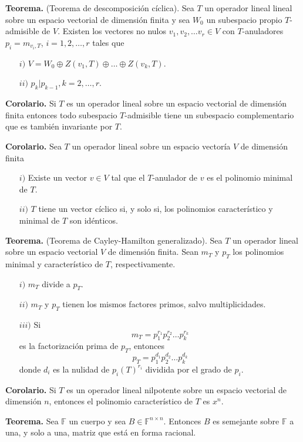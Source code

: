 \newpage

\textbf{Teorema.} (Teorema de descomposición cíclica).
Sea $T$ un operador lineal lineal sobre un espacio vectorial
de dimensión finita y sea $W_0$ un subespacio propio
$T$-admisible de $V$. Existen los vectores no nulos
$v_1, v_2, \dots v_r\in V$ con $T$-anuladores
$p_i=m_{v_i, T}$, $i=1,2,\dots,r$ tales que
\begin{itemize}
    \item[$i)$] $V=W_0\oplus Z(v_1, T)\oplus \dots \oplus Z(v_k, T)$.
    \item[$ii)$] $p_k|p_{k-1}, k=2,\dots,r$.
\end{itemize}

\textbf{Corolario.} Si $T$ es un operador lineal sobre
un espacio vectorial de dimensión finita entonces todo
subespacio $T$-admisible tiene un subespacio complementario
que es también invariante por $T$.

\textbf{Corolario.}
Sea $T$ un operador lineal sobre un espacio vectoría $V$ de dimensión
finita
\begin{itemize}
    \item[$i)$] Existe un vector $v\in V$ tal que el $T$-anulador
    de $v$ es el polinomio minimal de $T$.
    \item[$ii)$] $T$ tiene un vector cíclico si, y solo si, los
    polinomios característico y minimal de $T$ son idénticos.
\end{itemize}

\textbf{Teorema.} (Teorema de Cayley-Hamilton generalizado). Sea $T$
un operador lineal sobre un espacio vectorial $V$ de dimensión finita.
Sean $m_T$ y $p_T$ los polinomios minimal y característico de $T$,
respectivamente.
\begin{itemize}
    \item[$i)$]  $m_T$ divide a $p_T$.
    \item[$ii)$]  $m_T$ y $p_T$ tienen los mismos factores primos,
    salvo multiplicidades.
    \item[$iii)$] Si $$m_T=p_1^{r_1}p_2^{r_2}\dots p_k^{r_k}$$
    es la factorización prima de $p_T$, entonces
    $$p_T=p_1^{d_1}p_2^{d_2}\dots p_k^{d_k}$$
    donde $d_i$ es la nulidad de $p_i(T)^{r_i}$ dividida por el grado de $p_i$.
\end{itemize}

\textbf{Corolario.} Si $T$ es un operador lineal nilpotente
sobre un espacio vectorial de dimensión $n$, entonces el
polinomio característico de $T$ es $x^{n}$.

\textbf{Teorema.} Sea $\mathbb{F}$ un cuerpo y sea $B\in
\mathbb{F}^{n\times n}$. Entonces $B$ es semejante sobre
$\mathbb{F}$ a una, y solo a una, matriz que está en forma
racional.